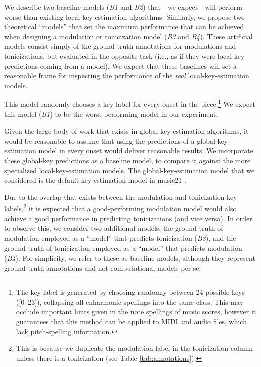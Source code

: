 
We describe two baseline models (\emph{B1} and \emph{B2})
that---we expect---will perform worse than existing
local-key-estimation algorithms. Similarly, we propose two
theoretical ``models'' that set the maximum performance that
can be achieved when designing a modulation or tonicization
model (\emph{B3} and \emph{B4}). These artificial models
consist simply of the ground truth annotations for
modulations and tonicizations, but evaluated in the opposite
task (i.e., as if they were local-key predictions coming
from a model). We expect that these baselines will set a
reasonable frame for inspecting the performance of the
\emph{real} local-key-estimation models.

This model randomly chooses a key label for every onset in
the piece.\footnote{
    The key label is generated by choosing randomly between
    24 possible keys ([0--23]), collapsing all enharmonic
    spellings into the same class. This may occlude
    important hints given in the note spellings of music
    scores, however it guarantees that this method can be
    applied to MIDI and audio files, which lack
    pitch-spelling information.} We expect this model
    (\emph{B1}) to be the worst-performing model in our
    experiment.

Given the large body of work that exists in
global-key-estimation algorithms, it would be reasonable to
assume that using the predictions of a global-key-estimation
model in every onset would deliver reasonable results. We
incorporate these global-key predictions as a baseline
model, to compare it against the more specialized
local-key-estimation models. The global-key-estimation model
that we considered is the default key-estimation model in
music21 \parencite{cuthbert2010music21}.


Due to the overlap that exists between the modulation and
tonicization key labels,\footnote{This is because we
duplicate the modulation label in the tonicization column
unless there is a tonicization (see Table
\ref{tab:annotations}).} it is expected that a
good-performing modulation model would also achieve a good
performance in predicting tonicizations (and vice versa). In
order to observe this, we consider two additional models:
the ground truth of modulation employed as a ``model'' that
predicts tonicization (\emph{B3}), and the ground truth of
tonicization employed as a ``model'' that predicts
modulation (\emph{B4}). For simplicity, we refer to these as
baseline models, although they represent ground-truth
annotations and not computational models per se.


